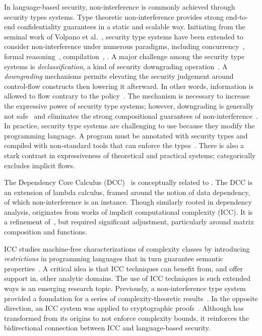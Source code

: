 In language-based security, non-interference is commonly achieved through security types systems.
Type theoretic non-interference provides strong end-to-end confidentiality guarantees in a static and scalable way.
Initiating from the seminal work of Volpano et al.~\cite{VolpanoI1996}, security type systems have been extended to consider non-interference under numerous paradigms,
including concurrency~\cite{volpano1998,derakhshan2024,frumin2021}, formal reasoning~\cite{nelson2020,frumin2021}, compilation~\cite{barthe2004}, \etc.
A major challenge among the security type systems is \emph{declassification}, a kind of security downgrading operation~\cite{cecchetti2017}.
A \emph{downgrading} mechanisms permits elevating the security judgement around control-flow constructs then lowering it afterward.
In other words, information is allowed to flow contrary to the policy~\cite{cecchetti2017}.
The mechanism is necessary to increase the expressive power of security type systems;
however, downgrading is generally not safe~\cite{derakhshan2024} and eliminates the strong compositional guarantees of non-interference~\cite{cecchetti2017}.
In practice, security type systems are challenging to use because they modify the programming language.
A program must be annotated with security types and compiled with non-standard tools that can enforce the types~\cite{lamba2024}.
There is also a stark contrast in expressiveness of theoretical and practical systems;
\eg \cite{huang2014} categorically excludes implicit flows.

The Dependency Core Calculus (DCC)~\cite{abadi1999b} is conceptually related to \lname.
The DCC is an extension of lambda calculus, framed around the notion of data dependency, of which non-interference is an instance.
Though similarly rooted in dependency analysis, \lname originates from works of implicit computational complexity (ICC).
It is a refinement of~\cite{moyen20172,aubert20232}, but \lname required significant adjustment, particularly around matrix composition and functions.

ICC studies machine-free characterizations of complexity classes by introducing \emph{restrictions} in programming languages that in turn guarantee semantic properties~\cite{dallago2011}.
A critical idea is that ICC techniques can benefit from, and offer support in, other analytic domains.
The use of ICC techniques is such extended ways is an emerging research topic.
Previously, a non-interference type system provided a foundation for a series of complexity-theoretic results~\cite{marion2011,hainry2023}.
In the opposite direction, an ICC system was applied to cryptographic proofs~\cite{baillot2019}.
Although \lname has transformed from its origins to not enforce complexity bounds, it reinforces the bidirectional connection between ICC and language-based security.

